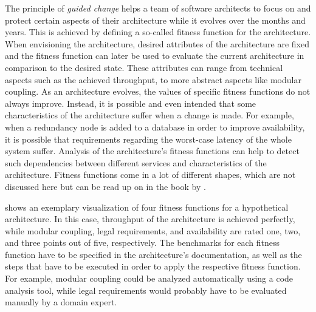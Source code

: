 The principle of \emph{guided change} helps a team of software architects to focus on and protect certain aspects of their architecture while it evolves over the months and years.
This is achieved by defining a so-called fitness function for the architecture.
When envisioning the architecture, desired attributes of the architecture are fixed and the fitness function can later be used to evaluate the current architecture in comparison to the desired state.
These attributes can range from technical aspects such as the achieved throughput, to more abstract aspects like modular coupling.
As an architecture evolves, the values of specific fitness functions do not always improve.
Instead, it is possible and even intended that some characteristics of the architecture suffer when a change is made.
For example, when a redundancy node is added to a database in order to improve availability, it is possible that requirements regarding the worst-case latency of the whole system suffer.
Analysis of the architecture's fitness functions can help to detect such dependencies between different services and characteristics of the architecture.
Fitness functions come in a lot of different shapes, which are not discussed here but can be read up on in the book by \citet{ford2017building}.

 shows an exemplary visualization of four fitness functions for a hypothetical architecture.
In this case, throughput of the architecture is achieved perfectly, while modular coupling, legal requirements, and availability are rated one, two, and three points out of five, respectively.
The benchmarks for each fitness function have to be specified in the architecture's documentation, as well as the steps that have to be executed in order to apply the respective fitness function.
For example, modular coupling could be analyzed automatically using a code analysis tool, while legal requirements would probably have to be evaluated manually by a domain expert.

